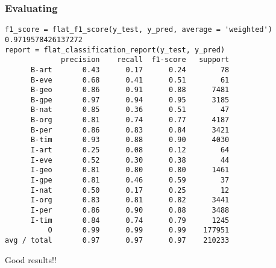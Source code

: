 \begin{frame}[fragile]\frametitle{Evaluating}
\begin{lstlisting}
f1_score = flat_f1_score(y_test, y_pred, average = 'weighted')
0.9719578426137272
report = flat_classification_report(y_test, y_pred)
             precision    recall  f1-score   support
      B-art       0.43      0.17      0.24        78
      B-eve       0.68      0.41      0.51        61
      B-geo       0.86      0.91      0.88      7481
      B-gpe       0.97      0.94      0.95      3185
      B-nat       0.85      0.36      0.51        47
      B-org       0.81      0.74      0.77      4187
      B-per       0.86      0.83      0.84      3421
      B-tim       0.93      0.88      0.90      4030
      I-art       0.25      0.08      0.12        64
      I-eve       0.52      0.30      0.38        44
      I-geo       0.81      0.80      0.80      1461
      I-gpe       0.81      0.46      0.59        37
      I-nat       0.50      0.17      0.25        12
      I-org       0.83      0.81      0.82      3441
      I-per       0.86      0.90      0.88      3488
      I-tim       0.84      0.74      0.79      1245
          O       0.99      0.99      0.99    177951
avg / total       0.97      0.97      0.97    210233
\end{lstlisting}

Good results!!
\end{frame}